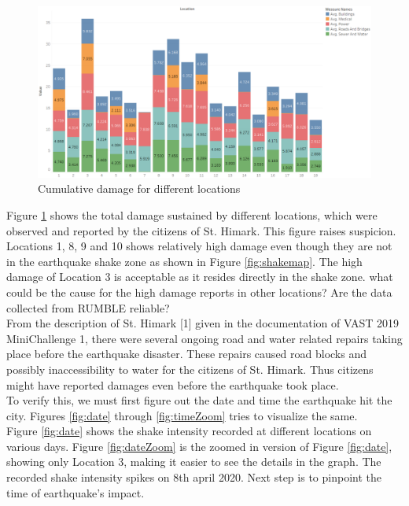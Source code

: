 \documentclass[12pt]{extarticle}
\begin{document}
\begin{figure}[H]
\centering
	\includegraphics[width=\linewidth]{Images/AllDamage.png}
	\caption{Cumulative damage for different locations }
	\label{fig:alldamage}
\end{figure}

Figure \ref{fig:alldamage} shows the total damage sustained by different locations, which were observed and reported by the citizens of St. Himark. This figure raises suspicion. Locations 1, 8, 9 and 10 shows relatively high damage even though they are not in the earthquake shake zone as shown in Figure \ref{fig:shakemap}. The high damage of Location 3 is acceptable as it resides directly in the shake zone. what could be the cause for the high damage reports in other locations? Are the data collected from RUMBLE reliable? \\

From the description of St. Himark [1] given in the documentation of VAST 2019 MiniChallenge 1, there were several ongoing road and water related repairs taking place before the earthquake disaster. These repairs caused road blocks and possibly inaccessibility to water for the citizens of St. Himark. Thus citizens might have reported damages even before the earthquake took place. \\

To verify this, we must first figure out the date and time the earthquake hit the city. Figures \ref{fig:date} through \ref{fig:timeZoom} tries to visualize the same. \\

Figure \ref{fig:date} shows the shake intensity recorded at different locations on various days.  Figure \ref{fig:dateZoom} is the zoomed in version of Figure \ref{fig:date}, showing only Location 3, making it easier to see the details in the graph. The recorded shake intensity spikes on 8th april 2020.  Next step is to pinpoint the time of earthquake's impact. \\
\end{document}
